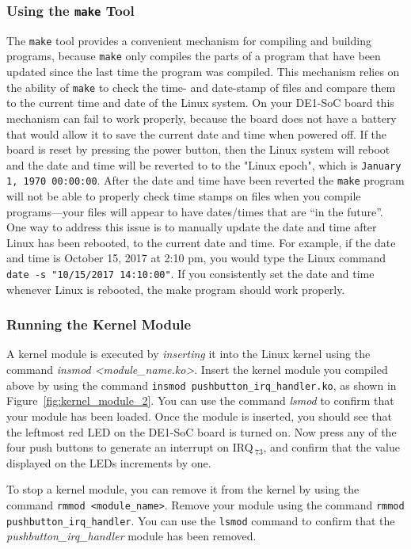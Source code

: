 \documentclass[11pt, twoside, pdftex]{article}
\begin{document}
\subsubsection{Using the \texttt{make} Tool}

The \texttt{make} tool provides a convenient mechanism for compiling and building programs,
because \texttt{make} only compiles the parts of a program that have been updated since the 
last time the program was compiled. This mechanism relies on the ability of \texttt{make} 
to check the time- and date-stamp of files and compare them to the current time and date of
the Linux system. On your DE1-SoC board this mechanism can fail to work properly, because the 
board does not have a battery that would allow it to save the current date and time when 
powered off. If the board is reset by pressing the power button, then the Linux system 
will reboot and the date and time will be reverted to to the "Linux epoch", which is 
\texttt{January 1, 1970 00:00:00}. After the date and time have been reverted
the \texttt{make} program will not be able to properly check time 
stamps on files when you compile programs---your files will appear to have dates/times that
are ``in the future''. One way to address this issue is to manually update the date and time
after  Linux has been rebooted, to the current date and time. For example, if the date and time 
is October 15, 2017 at 2:10 pm, you would type the Linux command 
\texttt{date -s "10/15/2017 14:10:00"}. If you consistently set the date and time whenever
Linux is rebooted, the make program should work properly.

\subsubsection{Running the Kernel Module}

A kernel module is executed by {\it inserting} it into the Linux kernel using the command
{\it insmod <module\_name.ko>}. Insert the kernel module you compiled above by
using the command \texttt{insmod pushbutton\_irq\_handler.ko}, as shown in
Figure~\ref{fig:kernel_module_2}. You can use the command {\it lsmod} to confirm that 
your module has been loaded. Once the module is inserted, you should see that the leftmost
red LED on the DE1-SoC board is turned on. Now press any of the four push buttons to generate 
an interrupt on IRQ$\,_{73}$, and confirm that the value displayed on the LEDs increments by one. 

To stop a kernel module, you can remove it from the kernel by using the command
\texttt{rmmod <module\_name>}. Remove your module using the command \texttt{rmmod
pushbutton\_irq\_handler}. You can use the \texttt{lsmod} command to confirm that 
the \textit{pushbutton\_irq\_handler} module has been removed.
\end{document}
